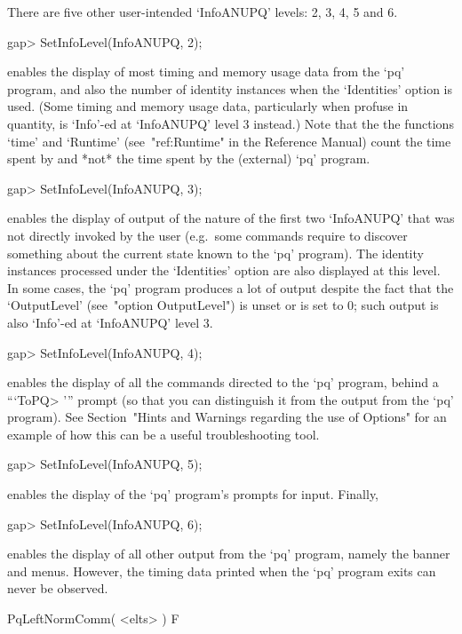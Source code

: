 There are five other user-intended `InfoANUPQ' levels: 2, 3, 4, 5 and 6.

\beginexample
gap> SetInfoLevel(InfoANUPQ, 2);
\endexample

enables the display of most timing and memory usage data  from  the  `pq'
program, and also the number of identity instances when the  `Identities'
option is used. (Some timing and memory  usage  data,  particularly  when
profuse in quantity, is `Info'-ed at `InfoANUPQ' level 3  instead.)  Note
that the the {\GAP} functions `time' and `Runtime' (see~"ref:Runtime"  in
the {\GAP} Reference Manual) count the time spent by {\GAP} and *not* the
time spent by the (external) `pq' program.

\beginexample
gap> SetInfoLevel(InfoANUPQ, 3);
\endexample

enables the display of output of the nature of the first two  `InfoANUPQ'
that was not directly invoked by the  user  (e.g.~some  commands  require
{\GAP} to discover something about the current state known  to  the  `pq'
program). The identity instances processed under the `Identities'  option
are also displayed at  this  level.  In  some  cases,  the  `pq'  program
produces a  lot  of  output  despite  the  fact  that  the  `OutputLevel'
(see~"option OutputLevel") is unset or is set to 0; such output  is  also
`Info'-ed at `InfoANUPQ' level 3.

\beginexample
gap> SetInfoLevel(InfoANUPQ, 4);
\endexample

enables the display of all the commands  directed  to  the  `pq'  program,
behind a ```ToPQ> ''' prompt (so that you can  distinguish  it  from  the
output from the `pq' program). See Section~"Hints and Warnings  regarding
the use of  Options"  for  an  example  of  how  this  can  be  a  useful
troubleshooting tool.

\beginexample
gap> SetInfoLevel(InfoANUPQ, 5);
\endexample

enables the display of the `pq' program's prompts for input. Finally,

\beginexample
gap> SetInfoLevel(InfoANUPQ, 6);
\endexample

enables the display of all other output from the `pq' program, namely  the
banner and menus. However, the timing data printed when the  `pq'  program
exits can never be observed.


\>PqLeftNormComm( <elts> ) F

